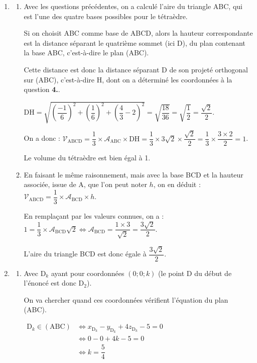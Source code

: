 \documentclass[10pt]{article}
\begin{document}
\begin{enumerate}
	\item \begin{enumerate}
		\item Avec les questions précédentes, on a calculé l'aire du triangle ABC, qui est l'une des quatre bases possibles pour le tétraèdre.

		Si on choisit ABC comme base de ABCD, alors la hauteur correspondante est la distance séparant le quatrième sommet (ici D), du plan contenant la base ABC, c'est-à-dire le plan (ABC).

		Cette distance est donc la distance séparant D de son projeté orthogonal sur (ABC), c'est-à-dire H, dont on a déterminé les coordonnées à la question \textbf{4.}.

		$\mathrm{DH} = \sqrt{\left(\dfrac{-1}{6}\right)^2 + \left(\dfrac{1}{6}\right)^2 + \left(\dfrac{4}{3} - 2\right) ^2 } = \sqrt{\dfrac{18}{36}} = \sqrt{\dfrac{1}{2}} = \dfrac{\sqrt{2}}{2}$.

		On a donc : \quad $\mathcal{V}_{\mathrm{ABCD}} = \dfrac{1}{3} \times \mathcal{A}_{\mathrm{ABC}} \times \mathrm{DH} = \dfrac{1}{3} \times 3\sqrt{2} \times \dfrac{\sqrt{2}}{2} = \dfrac{1}{3} \times \dfrac{3 \times 2}{2} = 1$.

		Le volume du tétraèdre est bien égal à 1.

		\item En faisant le même raisonnement, mais avec la base BCD et la hauteur associée, issue de A, que l'on peut noter $h$, on en déduit :\quad $\mathcal{V}_{\mathrm{ABCD}} = \dfrac{1}{3} \times \mathcal{A}_{\mathrm{BCD}} \times h$.

		En remplaçant par les valeurs connues, on a :\quad $1 = \dfrac{1}{3} \times \mathcal{A}_{\mathrm{BCD}} \sqrt{2} \iff \mathcal{A}_{\mathrm{BCD}} = \dfrac{1 \times 3}{\sqrt{2}} = \dfrac{3\sqrt{2}}{2}$.

		L'aire du triangle BCD est donc égale à $\dfrac{3\sqrt{2}}{2}$.
	\end{enumerate}

	\item \begin{enumerate}
		\item Avec $\mathrm{D}_k$ ayant pour coordonnées $(0 ; 0 ; k)$ (le point D du début de l'énoncé est donc $\mathrm{D}_2$).

		On va chercher quand ces coordonnées vérifient l'équation du plan (ABC).

		$\begin{aligned}
			\mathrm{D}_k \in (\mathrm{ABC})
				&\iff x_{\mathrm{D}_k} - y_{\mathrm{D}_k} + 4z_{\mathrm{D}_k} - 5 = 0\\
				&\iff 0 - 0 +4k  - 5 = 0\\
				&\iff k = \dfrac{5}{4}
 		\end{aligned}$


\end{enumerate}
\end{enumerate}
\end{document}
